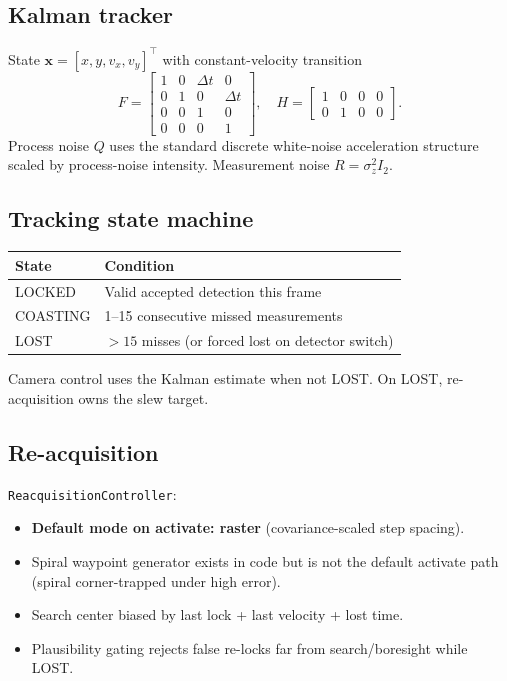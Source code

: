 \documentclass[11pt,a4paper]{article}
\begin{document}
\subsection{Kalman tracker}
State $\mathbf{x}=[x,y,v_x,v_y]^\top$ with constant-velocity transition
\begin{equation}
F
=
\begin{bmatrix}
1 & 0 & \Delta t & 0\\
0 & 1 & 0 & \Delta t\\
0 & 0 & 1 & 0\\
0 & 0 & 0 & 1
\end{bmatrix},
\quad
H
=
\begin{bmatrix}
1 & 0 & 0 & 0\\
0 & 1 & 0 & 0
\end{bmatrix}.
\end{equation}
Process noise $Q$ uses the standard discrete white-noise acceleration structure scaled by process-noise intensity.
Measurement noise $R=\sigma_z^2 I_2$.

\subsection{Tracking state machine}
\begin{center}
\begin{tabular}{@{}ll@{}}
\toprule
\textbf{State} & \textbf{Condition} \\
\midrule
LOCKED & Valid accepted detection this frame \\
COASTING & 1--15 consecutive missed measurements \\
LOST & $>15$ misses (or forced lost on detector switch) \\
\bottomrule
\end{tabular}
\end{center}
Camera control uses the Kalman estimate when not LOST.
On LOST, re-acquisition owns the slew target.

\subsection{Re-acquisition}
\texttt{ReacquisitionController}:
\begin{itemize}[leftmargin=1.4em]
  \item \textbf{Default mode on activate: raster} (covariance-scaled step spacing).
  \item Spiral waypoint generator exists in code but is not the default activate path (spiral corner-trapped under high error).
  \item Search center biased by last lock + last velocity + lost time.
  \item Plausibility gating rejects false re-locks far from search/boresight while LOST.
\end{itemize}
\end{document}
